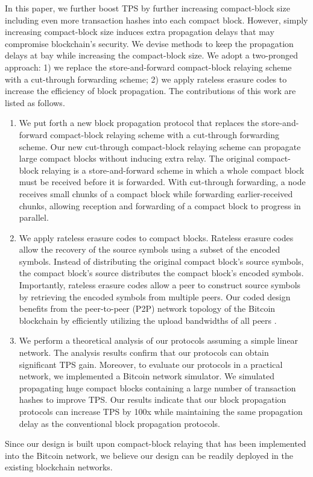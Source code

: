 \documentclass[10pt,journal,compsoc]{IEEEtran}
\begin{document}
In this paper, we further boost TPS by further increasing compact-block size including even more transaction hashes into each compact block. However, simply increasing compact-block size induces extra propagation delays that may compromise blockchain's security. We devise methods to keep the propagation delays at bay while increasing the compact-block size. We adopt a two-pronged approach: 1) we replace the store-and-forward compact-block relaying scheme with a cut-through forwarding scheme; 2) we apply rateless erasure codes to increase the efficiency of block propagation. The contributions of this work are listed as follows.
\begin{enumerate}
\item We put forth a new block propagation protocol that replaces the store-and-forward compact-block relaying scheme with a cut-through forwarding scheme. Our new cut-through compact-block relaying scheme can propagate large compact blocks without inducing extra relay. The original compact-block relaying \cite{corallo2017compact,ozisik2017graphene} is a store-and-forward scheme in which a whole compact block must be received before it is forwarded. With cut-through forwarding, a node receives small chunks of a compact block while forwarding earlier-received chunks, allowing reception and forwarding of a compact block to progress in parallel.
\item We apply rateless erasure codes to compact blocks. Rateless erasure codes allow the recovery of the source symbols using a subset of the encoded symbols. Instead of distributing the original compact block’s source symbols, the compact block's source distributes the compact block’s encoded symbols. Importantly, rateless erasure codes allow a peer to construct source symbols by retrieving the encoded symbols from multiple peers. Our coded design benefits from the peer-to-peer (P2P) network topology of the Bitcoin blockchain by efficiently utilizing the upload bandwidths of all peers \cite{gkantsidis2005network}.
\item We perform a theoretical analysis of our protocols assuming a simple linear network. The analysis results confirm that our protocols can obtain significant TPS gain. Moreover, to evaluate our protocols in a practical network, we implemented a Bitcoin network simulator. We simulated propagating huge compact blocks containing a large number of transaction hashes to improve TPS. Our results indicate that our block propagation protocols can increase TPS by 100x while maintaining the same propagation delay as the conventional block propagation protocols. 
\end{enumerate}	
Since our design is built upon compact-block relaying that has been implemented into the Bitcoin network, we believe our design can be readily deployed in the existing blockchain networks. 
\end{document}
